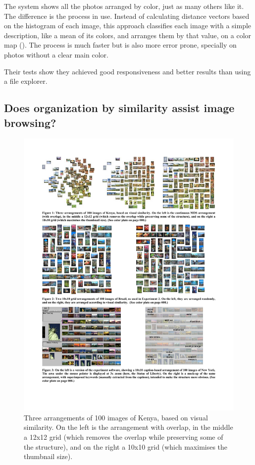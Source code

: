 The system shows all the photos arranged by color, just as many others like it. The difference is the process in use. Instead of calculating distance vectors based on the histogram of each image, this approach classifies each image with a simple description, like a mean of its colors, and arranges them by that value, on a color map (). The process is much faster but is also more error prone, specially on photos without a clear main color.

Their tests show they achieved good responsiveness and better results than using a file explorer.


\subsection{Does organization by similarity assist image browsing?} %
\label{sub:Rodden}
\begin{figure}[ht]
	\centering
		\includegraphics[width=\textwidth]{imgs-RelatedWork/Rodden1}
	\caption{Three arrangements of 100 images of Kenya, based on visual similarity. On the left is the arrangement with overlap, in the middle a 12x12 grid (which removes the overlap while preserving some of the structure), and on the right a 10x10 grid (which maximises the thumbnail size).}
	\label{fig:Rodden1}
\end{figure}


